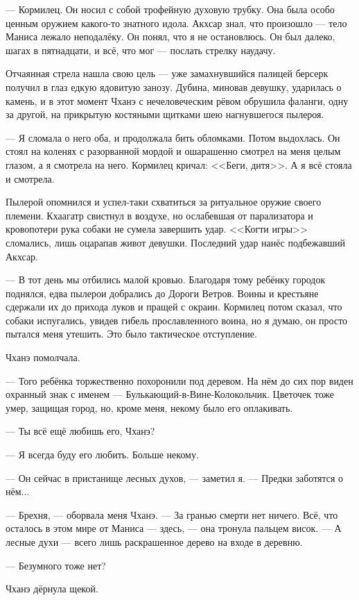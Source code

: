 --- Кормилец.
Он носил с собой трофейную духовую трубку.
Она была особо ценным оружием какого-то знатного идола.
Акхсар знал, что произошло --- тело Маниса лежало неподалёку.
Он понял, что я не остановлюсь.
Он был далеко, шагах в пятнадцати, и всё, что мог --- послать стрелку наудачу.

Отчаянная стрела нашла свою цель --- уже замахнувшийся палицей берсерк получил в глаз едкую ядовитую занозу.
Дубина, миновав девушку, ударилась о камень, и в этот момент Чханэ с нечеловеческим рёвом обрушила фаланги, одну за другой, на прикрытую костяными щитками шею нагнувшегося пылероя.

--- Я сломала о него оба, и продолжала бить обломками.
Потом выдохлась.
Он стоял на коленях с разорванной мордой и ошарашенно смотрел на меня целым глазом, а я смотрела на него.
Кормилец кричал: <<Беги, дитя>>.
А я всё стояла и смотрела.

Пылерой опомнился и успел-таки схватиться за ритуальное оружие своего племени.
Кхаагатр свистнул в воздухе, но ослабевшая от парализатора и кровопотери рука собаки не сумела завершить удар.
<<Когти игры>> сломались, лишь оцарапав живот девушки.
Последний удар нанёс подбежавший Акхсар.

--- В тот день мы отбились малой кровью.
Благодаря тому ребёнку городок поднялся, едва пылерои добрались до Дороги Ветров.
Воины и крестьяне сдержали их до прихода луков и пращей с окраин.
Кормилец потом сказал, что собаки испугались, увидев гибель прославленного воина, но я думаю, он просто пытался меня утешить.
Это было тактическое отступление.

Чханэ помолчала.

--- Того ребёнка торжественно похоронили под деревом.
На нём до сих пор виден охранный знак с именем --- Булькающий-в-Вине-Колокольчик.
Цветочек тоже умер, защищая город, но, кроме меня, некому было его оплакивать.

--- Ты всё ещё любишь его, Чханэ?

--- Я всегда буду его любить.
Больше некому.

--- Он сейчас в пристанище лесных духов, --- заметил я.
--- Предки заботятся о нём...

--- Брехня, --- оборвала меня Чханэ.
--- За гранью смерти нет ничего.
Всё, что осталось в этом мире от Маниса --- здесь, --- она тронула пальцем висок.
--- А лесные духи --- всего лишь раскрашенное дерево на входе в деревню.

--- Безумного тоже нет?

Чханэ дёрнула щекой.


